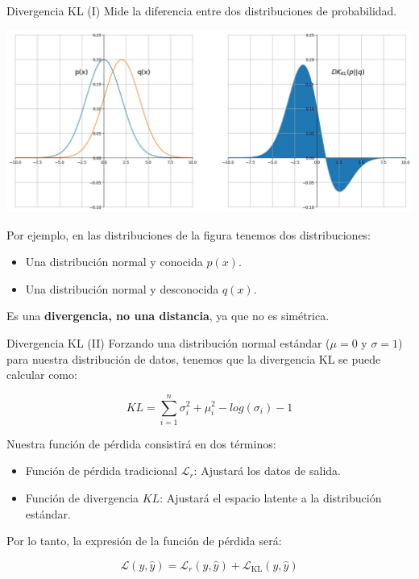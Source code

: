 \begin{frame}{Divergencia KL (I)}
Mide la diferencia entre dos distribuciones de probabilidad.

\begin{center}
    \includegraphics[width=.6\textwidth]{Slides/figures/02_Metodos_Generativos/nn-kl-divergence.png}
\end{center}

Por ejemplo, en las distribuciones de la figura tenemos dos distribuciones:

\begin{itemize}
    \item Una distribución normal y conocida $p(x)$.
    \item Una distribución normal y desconocida $q(x)$.
\end{itemize}

Es una \textbf{divergencia, no una distancia}, ya que no es simétrica.
\end{frame}

\begin{frame}{Divergencia KL (II)}
Forzando una distribución normal estándar ($\mu = 0$ y $\sigma = 1$) para nuestra distribución de datos, tenemos que la divergencia KL se puede calcular como:

$$
KL = \sum_{i=1}^{n}\sigma_{i}^{2} + \mu_{i}^{2}-log(\sigma_i)-1
$$

Nuestra función de pérdida consistirá en dos términos:

\begin{itemize}
    \item Función de pérdida tradicional $\mathcal{L}_r$: Ajustará los datos de salida.
    \item Función de divergencia $KL$: Ajustará el espacio latente a la distribución estándar.
\end{itemize}

Por lo tanto, la expresión de la función de pérdida será:

$$
\mathcal{L}(y, \hat{y}) = \mathcal{L}_r(y, \hat{y}) + \mathcal{L}_{\text{KL}} (y, \hat{y})
$$

\end{frame}


